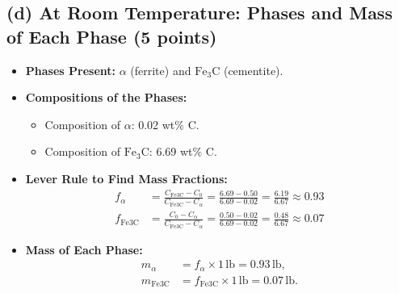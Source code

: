 \documentclass[11pt]{article}
\begin{document}
\subsection*{(d) At Room Temperature: Phases and Mass of Each Phase (5 points)}
\begin{itemize}
    \item \textbf{Phases Present:} \(\alpha\) (ferrite) and \(\text{Fe}_3\text{C}\) (cementite).
    \item \textbf{Compositions of the Phases:}
    \begin{itemize}
        \item Composition of \(\alpha\): 0.02 wt\% C.
        \item Composition of \(\text{Fe}_3\text{C}\): 6.69 wt\% C.
    \end{itemize}
    \item \textbf{Lever Rule to Find Mass Fractions:}
    \begin{align*}
        f_\alpha &= \frac{C_\text{Fe3C} - C_0}{C_\text{Fe3C} - C_\alpha} = \frac{6.69 - 0.50}{6.69 - 0.02} = \frac{6.19}{6.67} \approx 0.93 \\
        f_\text{Fe3C} &= \frac{C_0 - C_\alpha}{C_\text{Fe3C} - C_\alpha} = \frac{0.50 - 0.02}{6.69 - 0.02} = \frac{0.48}{6.67} \approx 0.07
    \end{align*}
    \item \textbf{Mass of Each Phase:}
    \begin{align*}
        m_\alpha &= f_\alpha \times 1 \, \text{lb} = 0.93 \, \text{lb}, \\
        m_\text{Fe3C} &= f_\text{Fe3C} \times 1 \, \text{lb} = 0.07 \, \text{lb}.
    \end{align*}
\end{itemize}
\end{document}
